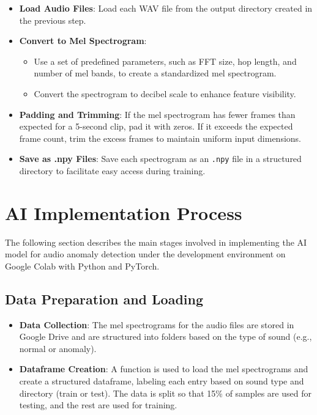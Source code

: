 \documentclass[conference]{IEEEtran}
\begin{document}
\begin{itemize}
    \item \textbf{Load Audio Files}: Load each WAV file from the output directory created in the previous step.
    \item \textbf{Convert to Mel Spectrogram}:
        \begin{itemize}
            \item Use a set of predefined parameters, such as FFT size, hop length, and number of mel bands, to create a standardized mel spectrogram.
            \item Convert the spectrogram to decibel scale to enhance feature visibility.
        \end{itemize}
    \item \textbf{Padding and Trimming}: If the mel spectrogram has fewer frames than expected for a 5-second clip, pad it with zeros. If it exceeds the expected frame count, trim the excess frames to maintain uniform input dimensions.
    \item \textbf{Save as .npy Files}: Save each spectrogram as an \texttt{.npy} file in a structured directory to facilitate easy access during training.
\end{itemize}

\section{AI Implementation Process}
The following section describes the main stages involved in implementing the AI model for audio anomaly detection under the development environment on Google Colab with Python and PyTorch.

\subsection{Data Preparation and Loading}
\begin{itemize}
    \item \textbf{Data Collection}: The mel spectrograms for the audio files are stored in Google Drive and are structured into folders based on the type of sound (e.g., normal or anomaly).
    \item \textbf{Dataframe Creation}: A function is used to load the mel spectrograms and create a structured dataframe, labeling each entry based on sound type and directory (train or test). The data is split so that 15\% of samples are used for testing, and the rest are used for training.
\end{itemize}
\end{document}
